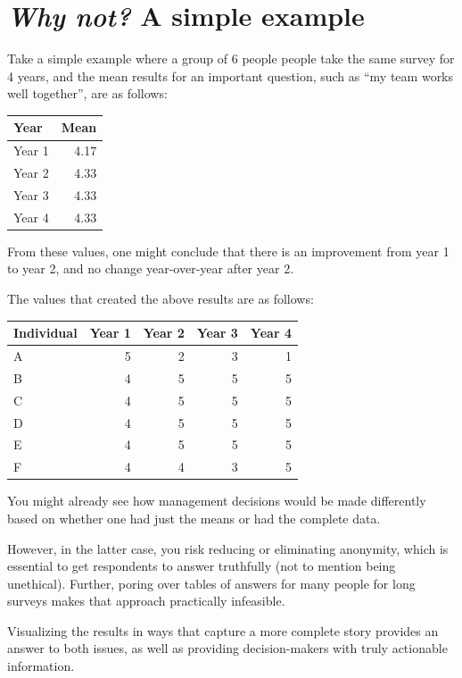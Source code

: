 \documentclass[]{book}
\begin{document}
\chapter{\texorpdfstring{\emph{Why not?} A simple
example}{Why not? A simple example}}\label{why-not-a-simple-example}

Take a simple example where a group of 6 people people take the same
survey for 4 years, and the mean results for an important question, such
as ``my team works well together'', are as follows:

\begin{tabular}{l|r}
\hline
Year & Mean\\
\hline
Year 1 & 4.17\\
\hline
Year 2 & 4.33\\
\hline
Year 3 & 4.33\\
\hline
Year 4 & 4.33\\
\hline
\end{tabular}

From these values, one might conclude that there is an improvement from
year 1 to year 2, and no change year-over-year after year 2.

The values that created the above results are as follows:

\begin{tabular}{l|r|r|r|r}
\hline
Individual & Year 1 & Year 2 & Year 3 & Year 4\\
\hline
A & 5 & 2 & 3 & 1\\
\hline
B & 4 & 5 & 5 & 5\\
\hline
C & 4 & 5 & 5 & 5\\
\hline
D & 4 & 5 & 5 & 5\\
\hline
E & 4 & 5 & 5 & 5\\
\hline
F & 4 & 4 & 3 & 5\\
\hline
\end{tabular}

You might already see how management decisions would be made differently
based on whether one had just the means or had the complete data.

However, in the latter case, you risk reducing or eliminating anonymity,
which is essential to get respondents to answer truthfully (not to
mention being unethical). Further, poring over tables of answers for
many people for long surveys makes that approach practically infeasible.

Visualizing the results in ways that capture a more complete story
provides an answer to both issues, as well as providing decision-makers
with truly actionable information.
\end{document}
